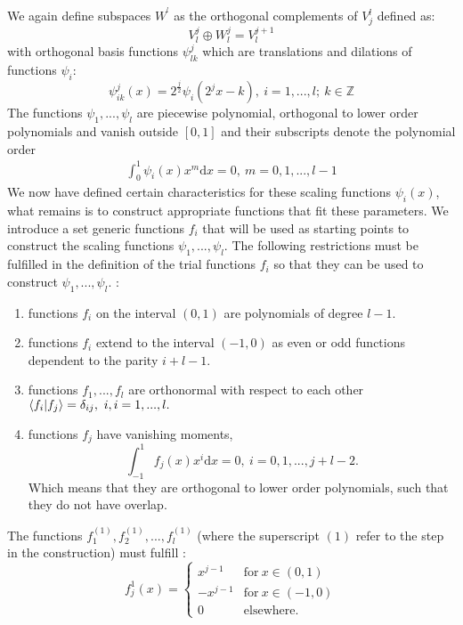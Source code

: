 \documentclass[../master_thesis.tex]{subfiles}
\begin{document}
We again define subspaces $W^^l$ as the orthogonal complements of $V^l_j$
\cite{Alpert1993} defined as:
\begin{equation}
  V_l^j \oplus W^j_l = V_l^{j+1}
\end{equation}
 with orthogonal basis functions  $\psi^j_{lk}$ which are translations and dilations of functions $\psi_i$:
 \begin{equation}
   \psi^j_{ik}(x) = 2^\frac{j}{2}\psi_i(2^jx-k), \ i=1, ...,l;\ k \in \mathbb{Z}\label{eq:mwbasisfuncs}
 \end{equation}
 The functions $\psi_1, ...,\psi_l$ are piecewise polynomial, orthogonal to lower order polynomials and
 vanish outside $[0,1]$ and their subscripts denote the polynomial order \cite{Alpert1993}
\begin{align}
  \int_0^1\psi_i(x)x^m \text{d}x = 0,\ m = 0, 1, ..., l-1
\end{align}
We now have defined certain characteristics for these scaling functions $\psi_i(x)$,
what remains is to construct appropriate functions that fit these parameters.
We introduce a set generic functions $f_i$ that will be used as starting points
to construct the scaling functions $\psi_1, ...,\psi_l$. The following restrictions must be
fulfilled in the definition of the trial functions $f_i$ so that they can be
used to construct $\psi_1, ...,\psi_l$.
\cite{Alpert1993, Beylkin:MRA}:
\begin{enumerate}
  \item functions $f_i$ on the interval $(0,1)$ are polynomials of degree $l-1.$
  \item functions $f_i$ extend to the interval $(-1, 0)$ as even or odd functions
  dependent to the parity $i + l - 1$.
  \item functions $f_1,...,f_l$ are orthonormal with respect to each other $\braket{f_i| f_j} = \delta_{ij}, \ i, i = 1, ..., l.$
  \item functions $f_j$ have vanishing moments, $$\int_{-1}^1f_j(x)x^i\text{d}x = 0, \ i = 0, 1, ..., j+l-2.$$ Which means that they
  are orthogonal to lower order polynomials, such that they do not have overlap.
\end{enumerate}
The functions $f^{(1)}_1, f^{(1)}_2, ..., f^{(1)}_l$ (where the superscript
$(1)$ refer to the step in the construction)
must fulfill \cite{Alpert1993}:
\begin{equation}
  f^1_j(x) =
  \begin{cases}
  x^{j-1} & \text{for} \ x\in (0,1)\\
  -x^{j-1} & \text{for}\ x\in (-1, 0)\\
  0 & \text{elsewhere}.
\end{cases}
\end{equation}
\end{document}
